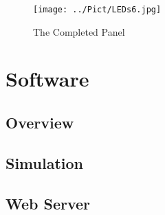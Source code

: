 \documentclass[10pt, openany]{book}
\begin{document}
\begin{figure}[ht!]
  \centering
  \texttt{[image: ../Pict/LEDs6.jpg]}
  \caption{The Completed Panel}
  \label{fig:LED6}
\end{figure}

\clearpage
\chapter{Software}
\section{Overview}

\section{Simulation}

\section{Web Server}
\end{document}

